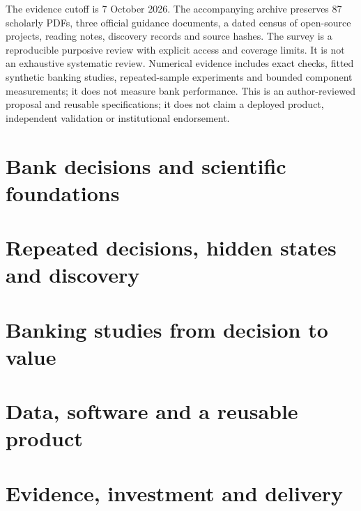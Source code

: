 \documentclass[11pt,a4paper,openany]{book}
\begin{document}
The evidence cutoff is 7 October 2026. The accompanying archive preserves 87
scholarly PDFs, three official guidance documents, a dated census of \SoftwareCount{}
open-source projects, reading notes, discovery records and source hashes.
The survey is a reproducible purposive review with explicit access and coverage
limits. It is not an exhaustive systematic review. Numerical evidence includes exact checks, fitted synthetic banking studies,
repeated-sample experiments and bounded component measurements; it does not
measure bank performance. This is an
author-reviewed proposal and reusable specifications; it does not claim a
deployed product, independent validation or institutional endorsement.

\begingroup\setlength{\parskip}{0pt}
\tableofcontents
\endgroup
\mainmatter
\part{Bank decisions and scientific foundations}



\part{Repeated decisions, hidden states and discovery}





\part{Banking studies from decision to value}



\part{Data, software and a reusable product}




\part{Evidence, investment and delivery}




\appendix

\backmatter


\end{document}
